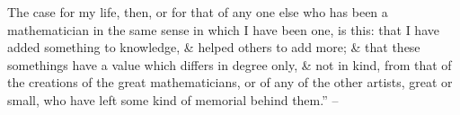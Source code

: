 \documentclass{article}
\numberwithin{equation}{section}
\begin{document}
The case for my life, then, or for that of any one else who has been a mathematician in the same sense in which I have been one, is this: that I have added something to knowledge, \& helped others to add more; \& that these somethings have a value which differs in degree only, \& not in kind, from that of the creations of the great mathematicians, or of any of the other artists, great or small, who have left some kind of memorial behind them.'' -- \cite[pp. 144--151]{Hardy1992}


\printbibliography[heading=bibintoc]
	
\end{document}

